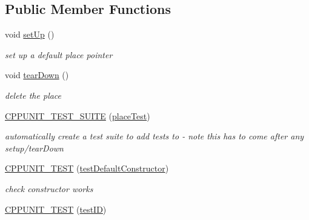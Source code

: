 \subsection*{Public Member Functions}
\begin{DoxyCompactItemize}
\item 
\mbox{\label{classplaceTest_a1818bbe31325c6d9344b35f3b510cacf}} 
void \mbox{\hyperlink{classplaceTest_a1818bbe31325c6d9344b35f3b510cacf}{set\+Up}} ()
\begin{DoxyCompactList}\small\item\em set up a default place pointer \end{DoxyCompactList}\item 
\mbox{\label{classplaceTest_a2a0d52566e44cc385dc8fecdae504d6f}} 
void \mbox{\hyperlink{classplaceTest_a2a0d52566e44cc385dc8fecdae504d6f}{tear\+Down}} ()
\begin{DoxyCompactList}\small\item\em delete the place \end{DoxyCompactList}\item 
\mbox{\label{classplaceTest_a48f337cc28990999494a191bd93a0546}} 
\mbox{\hyperlink{classplaceTest_a48f337cc28990999494a191bd93a0546}{C\+P\+P\+U\+N\+I\+T\+\_\+\+T\+E\+S\+T\+\_\+\+S\+U\+I\+TE}} (\mbox{\hyperlink{classplaceTest}{place\+Test}})
\begin{DoxyCompactList}\small\item\em automatically create a test suite to add tests to -\/ note this has to come after any setup/tear\+Down \end{DoxyCompactList}\item 
\mbox{\label{classplaceTest_ae53796f1cb068709a350189329eb4c95}} 
\mbox{\hyperlink{classplaceTest_ae53796f1cb068709a350189329eb4c95}{C\+P\+P\+U\+N\+I\+T\+\_\+\+T\+E\+ST}} (\mbox{\hyperlink{classplaceTest_a7f6879744d411bded42d786645595245}{test\+Default\+Constructor}})
\begin{DoxyCompactList}\small\item\em check constructor works \end{DoxyCompactList}\item 
\mbox{\label{classplaceTest_a1bde1ec54daa7825ca16e8f72473f79a}} 
\mbox{\hyperlink{classplaceTest_a1bde1ec54daa7825ca16e8f72473f79a}{C\+P\+P\+U\+N\+I\+T\+\_\+\+T\+E\+ST}} (\mbox{\hyperlink{classplaceTest_a1e4e638d2e34b0c247fe82455985aa34}{test\+ID}})

\end{DoxyCompactItemize}
